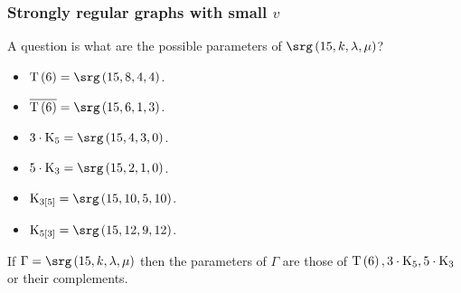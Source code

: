 \pagebreak

\subsubsection{Strongly regular graphs with small \texorpdfstring{$ v $}{v}}

A question is what are the possible parameters of $ \srg\br{15, k, \lambda, \mu} $?

\begin{example*}
\hfill
\begin{itemize}
\item $ \T\br{6} = \srg\br{15, 8, 4, 4} $.
\item $ \overline{\T\br{6}} = \srg\br{15, 6, 1, 3} $.
\item $ 3 \cdot \K_5 = \srg\br{15, 4, 3, 0} $.
\item $ 5 \cdot \K_3 = \srg\br{15, 2, 1, 0} $.
\item $ \K_{3\sbr{5}} = \srg\br{15, 10, 5, 10} $.
\item $ \K_{5\sbr{3}} = \srg\br{15, 12, 9, 12} $.
\end{itemize}
\end{example*}

\begin{proposition}
If $ \Gamma = \srg\br{15, k, \lambda, \mu} $ then the parameters of $ \Gamma $ are those of $ \T\br{6}, 3 \cdot \K_5, 5 \cdot \K_3 $ or their complements.
\end{proposition}

